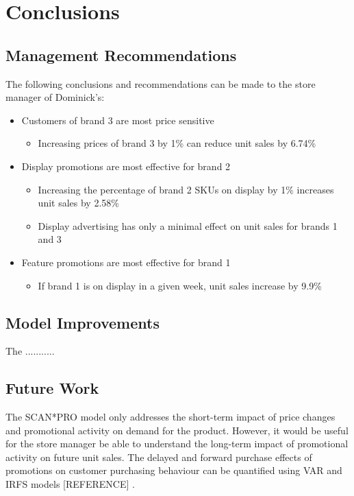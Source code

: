 \documentclass[a4paper,11pt]{article}
\begin{document}
\section{Conclusions}

\subsection{Management Recommendations}
The following conclusions and recommendations can be made to the store manager of Dominick's:
\begin{itemize}
    \item Customers of brand 3 are most price sensitive
    \begin{itemize}
        \item Increasing prices of brand 3 by 1\% can reduce unit sales by 6.74\%
    \end{itemize}
    \item Display promotions are most effective for brand 2
    \begin{itemize}
        \item Increasing the percentage of brand 2 SKUs on display by 1\% increases unit sales by 2.58\%
        \item Display advertising has only a minimal effect on unit sales for brands 1 and 3
    \end{itemize}
    \item Feature promotions are most effective for brand 1
    \begin{itemize}
        \item If brand 1 is on display in a given week, unit sales increase by 9.9\%
    \end{itemize}
\end{itemize}

\subsection{Model Improvements}
The ...........


\subsection{Future Work}
The SCAN*PRO model only addresses the short-term impact of price changes and promotional activity on demand for the product. However, it would be useful for the store manager be able to understand the long-term impact of promotional activity on future unit sales. The delayed and forward purchase effects of promotions on customer purchasing behaviour can be quantified using VAR and IRFS models [REFERENCE] .  



\end{document}
